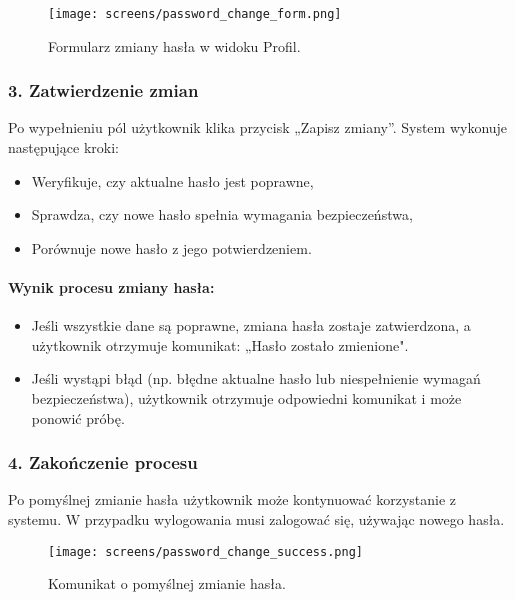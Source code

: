 \documentclass[12pt,a4paper,oneside]{article}
\theoremstyle{definition}
\numberwithin{equation}{section}
\begin{document}
\begin{figure}[h!]
    \centering
    \texttt{[image: screens/password\_change\_form.png]}
    \caption{Formularz zmiany hasła w widoku Profil.}
    \label{fig:password_change_form}
\end{figure}

\subsubsection*{\textbf{3. Zatwierdzenie zmian}}
Po wypełnieniu pól użytkownik klika przycisk „Zapisz zmiany”. System wykonuje następujące kroki:
\begin{itemize}
    \item Weryfikuje, czy aktualne hasło jest poprawne,
    \item Sprawdza, czy nowe hasło spełnia wymagania bezpieczeństwa,
    \item Porównuje nowe hasło z jego potwierdzeniem.
\end{itemize}

\paragraph{Wynik procesu zmiany hasła:}
\begin{itemize}
    \item Jeśli wszystkie dane są poprawne, zmiana hasła zostaje zatwierdzona, a użytkownik otrzymuje komunikat: „Hasło zostało zmienione".
    \item Jeśli wystąpi błąd (np. błędne aktualne hasło lub niespełnienie wymagań bezpieczeństwa), użytkownik otrzymuje odpowiedni komunikat i może ponowić próbę.
\end{itemize}

\subsubsection*{\textbf{4. Zakończenie procesu}}
Po pomyślnej zmianie hasła użytkownik może kontynuować korzystanie z systemu. W przypadku wylogowania musi zalogować się, używając nowego hasła.

\begin{figure}[h!]
    \centering
    \texttt{[image: screens/password\_change\_success.png]}
    \caption{Komunikat o pomyślnej zmianie hasła.}
    \label{fig:password_change_success}
\end{figure}



\renewcommand\refname{Literatura (jeżeli wymagana)}
%
%
%
%
\end{document}
